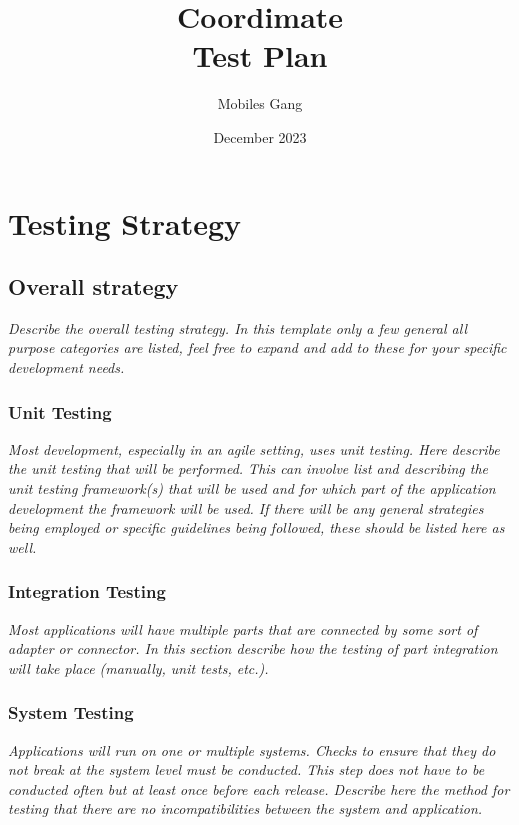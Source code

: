\documentclass{article}
\title{Coordimate\\Test Plan}
\date{December 2023}
\author{Mobiles Gang}
\begin{document}
\maketitle

\section{Testing Strategy}

\subsection{Overall strategy}

\textit{Describe the overall testing strategy. In this
template only a few general all purpose categories are listed, feel free to
expand and add to these for your specific development needs.}

\subsubsection{Unit Testing}

\textit{Most development, especially in an agile setting,
uses unit testing. Here describe the unit testing that will be performed. This
can involve list and describing the unit testing framework(s) that will be used
and for which part of the application development the framework will be used.
If there will be any general strategies being employed or specific guidelines
being followed, these should be listed here as well.}

\subsubsection{Integration Testing}

\textit{Most applications will have multiple
parts that are connected by some sort of adapter or connector. In this section
describe how the testing of part integration will take place (manually, unit
tests, etc.).}

\subsubsection{System Testing}

\textit{Applications will run on one or multiple
systems. Checks to ensure that they do not break at the system level must be
conducted. This step does not have to be conducted often but at least once
before each release. Describe here the method for testing that there are no
incompatibilities between the system and application.}
\end{document}
